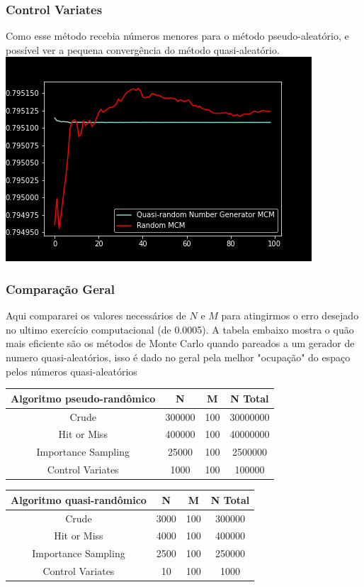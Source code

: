 \documentclass[twocolumn,amsmath,amssymb,floatfix]{revtex4}
\begin{document}
\subsubsection{Control Variates}
\indent Como esse método recebia números menores para o método pseudo-aleatório, e possível ver a pequena convergência do método quasi-aleatório.
\includegraphics[scale=0.55]{ControlVariatesComparison.png}
\subsubsection{Comparação Geral}
\indent Aqui compararei os valores necessários de $N$ e $M$ para atingirmos o erro desejado no ultimo exercício computacional (de 0.0005). A tabela embaixo mostra o quão mais eficiente são os métodos de Monte Carlo quando pareados a um gerador de numero quasi-aleatórios, isso é dado no geral pela melhor "ocupação" do espaço pelos números quasi-aleatórios
\begin{center}
 \begin{tabular}{||c c c c||} 
 \hline
 Algoritmo pseudo-randômico & N & M & N Total \\ [0.5ex] 
 \hline\hline
 Crude & 300000 & 100 & 30000000 \\ 
 \hline
 Hit or Miss & 400000 & 100 & 40000000 \\
 \hline
 Importance Sampling & 25000 & 100 & 2500000 \\
 \hline
 Control Variates & 1000 & 100 & 100000 \\
 \hline
\end{tabular}
\end{center}
\begin{center}
 \begin{tabular}{||c c c c||} 
 \hline
 Algoritmo quasi-randômico & N & M & N Total \\ [0.5ex] 
 \hline\hline
 Crude & 3000 & 100 & 300000 \\ 
 \hline
 Hit or Miss & 4000 & 100 & 400000 \\
 \hline
 Importance Sampling & 2500 & 100 & 250000 \\
 \hline
 Control Variates & 10 & 100 & 1000 \\
 \hline
\end{tabular}
\end{center}
\end{document}
